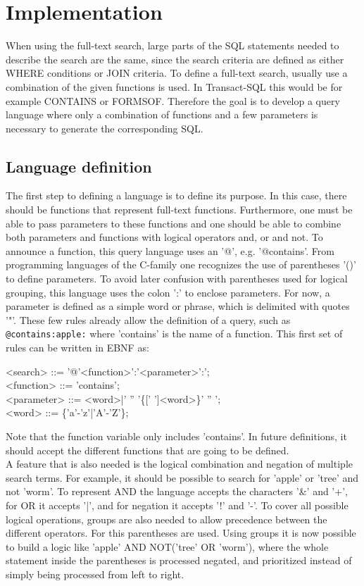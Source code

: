 \newpage
\section{Implementation}
When using the full-text search, large parts of the SQL statements needed to describe the search are the same, since the search criteria are defined as either WHERE conditions or JOIN criteria. To define a full-text search, usually use a combination of the given functions is used. In Transact-\ac{SQL} this would be for example CONTAINS or FORMSOF. Therefore the goal is to develop a query language where only a combination of functions and a few parameters is necessary to generate the corresponding SQL.
\subsection{Language definition}
The first step to defining a language is to define its purpose. In this case, there should be functions that represent full-text functions. Furthermore, one must be able to pass parameters to these functions and one should be able to combine both parameters and functions with logical operators and, or and not.
To announce a function, this query language uses an '@', e.g. '@contains'. From programming languages of the C-family one recognizes the use of parentheses '()' to define parameters. To avoid later confusion with parentheses used for logical grouping, this language uses the colon ':' to enclose parameters. For now, a parameter is defined as a simple word or phrase, which is delimited with quotes '"'. These few rules already allow the definition of a query, such as \lstinline[language=Fulltext-Search]$@contains:apple:$ where 'contains' is the name of a function.
This first set of rules can be written in \ac{EBNF} as:
\begin{grammar}
    <search> ::= '@'<function>':'<parameter>':'; \\
    <function> ::= 'contains'; \\
    <parameter> ::= <word>|' '' '\{[' ']<word>\}' '' '; \\
    <word> ::= \{'a'-'z'|'A'-'Z'\};
\end{grammar}
Note that the function variable only includes 'contains'. In future definitions, it should accept the different functions that are going to be defined.\\
A feature that is also needed is the logical combination and negation of multiple search terms. For example, it should be possible to search for 'apple' or 'tree' and not 'worm'. To represent AND the language accepts the characters '\&' and '+', for OR it accepts '|', and for negation it accepts '!' and '-'. To cover all possible logical operations, groups are also needed to allow precedence between the different operators. For this parentheses are used. Using groups it is now possible to build a logic like 'apple' AND NOT('tree' OR 'worm'), where the whole statement inside the parentheses is processed negated, and prioritized instead of simply being processed from left to right.\\
